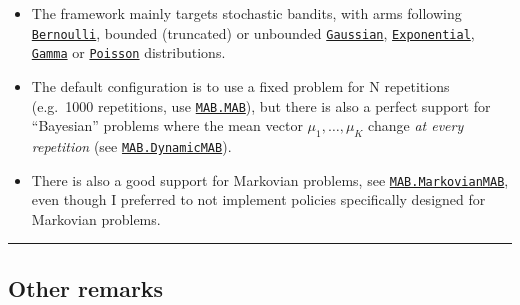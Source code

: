 \begin{itemize}
\tightlist
\item
  The framework mainly targets stochastic bandits, with arms following
  \href{https://smpybandits.github.io/docs/Arms/Bernoulli.html}{\texttt{Bernoulli}},
  bounded (truncated) or unbounded
  \href{https://smpybandits.github.io/docs/Arms/Gaussian.html}{\texttt{Gaussian}},
  \href{https://smpybandits.github.io/docs/Arms/Exponential.html}{\texttt{Exponential}},
  \href{https://smpybandits.github.io/docs/Arms/Gamma.html}{\texttt{Gamma}}
  or
  \href{https://smpybandits.github.io/docs/Arms/Poisson.html}{\texttt{Poisson}}
  distributions.
\item
  The default configuration is to use a fixed problem for N repetitions
  (e.g.~1000 repetitions, use
  \href{https://smpybandits.github.io/docs/Environment/MAB.html}{\texttt{MAB.MAB}}),
  but there is also a perfect support for ``Bayesian'' problems where
  the mean vector \(\mu_1,\dots,\mu_K\) change \emph{at every
  repetition} (see
  \href{https://smpybandits.github.io/docs/Environment/MAB.html}{\texttt{MAB.DynamicMAB}}).
\item
  There is also a good support for Markovian problems, see
  \href{https://smpybandits.github.io/docs/Environment/MAB.html}{\texttt{MAB.MarkovianMAB}},
  even though I preferred to not implement policies specifically
  designed for Markovian problems.
\end{itemize}

\begin{center}\rule{0.5\linewidth}{\linethickness}\end{center}

\hypertarget{other-remarks}{%
\subsection{Other remarks}\label{other-remarks}}


